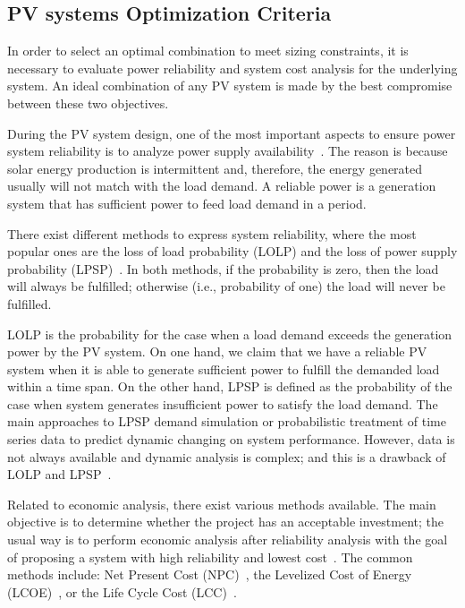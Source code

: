 \documentclass[review]{elsarticle}
\begin{document}
\subsection{PV systems Optimization Criteria}

In order to select an optimal combination to meet sizing constraints, 
it is necessary to evaluate power reliability and system cost analysis for the underlying system. An ideal combination of any PV system is made by the best compromise between these two objectives.

During the PV system design, one of the most important aspects to ensure power system reliability is to analyze power supply availability~\cite{Alsadi2018}. The reason is because solar energy production is intermittent and, therefore, the energy generated usually will not match with the load demand. A reliable power is a generation system that has sufficient power to feed load demand in a period. 

There exist different methods to express system reliability, where the most popular ones 
are the loss of load probability (LOLP) and the loss of power supply probability (LPSP)~\cite{Alsadi2018}. In both methods, if the probability is zero, then the load will always be fulfilled; otherwise (i.e., probability of one) the load will never be fulfilled.

LOLP is the probability for the case when a load demand exceeds the generation power by the PV system. On one hand, we claim that we have a reliable PV system when it is able to generate sufficient power to fulfill the demanded load within a time span. On the other hand, LPSP is defined as the probability of the case when system generates insufficient power to satisfy the load demand. The main approaches to LPSP demand simulation or probabilistic treatment of time series data to predict dynamic changing on system performance. However, data is not always available and dynamic analysis is complex; and this is a drawback of LOLP and LPSP~\cite{Alsadi2018}.

Related to economic analysis, there exist various methods available. The main objective is to determine whether the project has an acceptable investment; the usual way is to perform economic analysis after reliability analysis with the goal of proposing a system with high reliability and lowest cost~\cite{Alsadi2018}. The common methods include: Net Present Cost (NPC)~\cite{Park2004}, the Levelized Cost of Energy (LCOE)~\cite{Zhou2010}, or the Life Cycle Cost (LCC)~\cite{Applasamy2011}.
\end{document}
